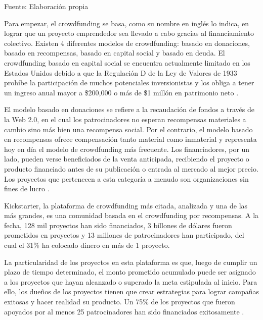 \begin{flushleft}	%
	\small Fuente: Elaboración propia
\end{flushleft}

Para empezar, el crowdfunding se basa, como su nombre en inglés lo indica, en lograr que un proyecto emprendedor sea llevado a cabo gracias al financiamiento colectivo. Existen 4 diferentes modelos de crowdfunding: basado en donaciones, basado en recompensas, basado en capital social y basado en deuda. El crowdfunding basado en capital social se encuentra actualmente limitado en los Estados Unidos debido a que la Regulación D de la Ley de Valores de 1933 prohíbe la participación de muchos potenciales inversionistas y los obliga a tener un ingreso anual mayor a \$200,000 o más de \$1 millón en patrimonio neto \parencite{cr_lichtig2015crowdfunding}.

El modelo basado en donaciones se refiere a la recaudación de fondos a través de la Web 2.0, en el cual los patrocinadores no esperan recompensas materiales a cambio sino más bien una recompensa social. Por el contrario, el modelo basado en recompensas ofrece compensación tanto material como inmaterial y representa hoy en día el modelo de crowdfunding más frecuente. Los financiadores, por un lado, pueden verse beneficiados de la venta anticipada, recibiendo el proyecto o producto financiado antes de su publicación o entrada al mercado al mejor precio. Los proyectos que pertenecen a esta categoría a menudo son organizaciones sin fines de lucro \parencite{cr_kraus2016crowdfunding_strategies}.

Kickstarter, la plataforma de crowdfunding más citada, analizada y una de las más grandes, es una comunidad basada en el crowdfunding por recompensas. A la fecha, 128 mil proyectos han sido financiados, 3 billones de dólares fueron prometidos en proyectos y 13 millones de patrocinadores han participado, del cual el 31\% ha colocado dinero en más de 1 proyecto.

La particularidad de los proyectos en esta plataforma es que, luego de cumplir un plazo de tiempo determinado, el monto prometido acumulado puede ser asignado a los proyectos que hayan alcanzado o superado la meta estipulada al inicio. Para ello, los dueños de los proyectos tienen que crear estrategias para lograr campañas exitosas y hacer realidad su producto. Un 75\% de los proyectos que fueron apoyados por al menos 25 patrocinadores han sido financiados exitosamente \parencite{cr_kickstarter_learn}.

